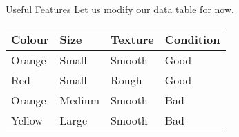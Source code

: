 \documentclass[usenames,dvipsnames]{beamer}
\begin{document}
\begin{frame}{Useful Features}
Let us modify our data table for now.
\begin{table}[]
	\begin{tabular}{|l|l|l||l|}
		\hline 
		\textbf{Colour} & \textbf{Size} & \textbf{Texture} & \textbf{Condition} \\ \hline 
		Orange & Small & Smooth  & Good      \\
		Red    & Small  & Rough  & Good \\
		Orange & Medium & Smooth & Bad \\
		Yellow & Large  & Smooth & Bad \\ \hline 

	\end{tabular}
\end{table}
\end{frame}
\end{document}
